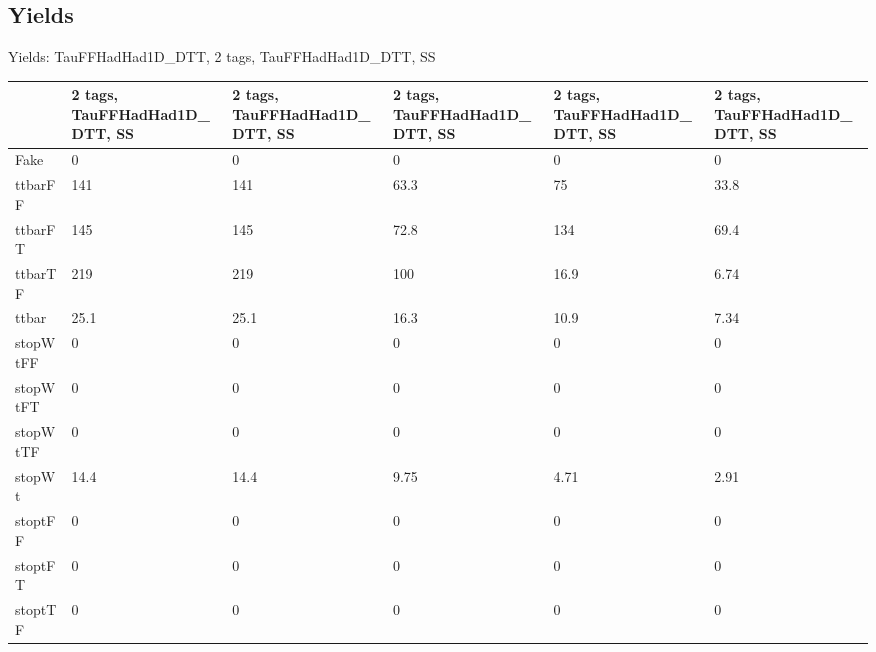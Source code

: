
\subsection{Yields}

\begin{frame}{Yields: TauFFHadHad1D\_DTT, 2 tags, TauFFHadHad1D\_DTT, SS}
\begin{center}
  \begin{tabular}{l| >{\centering\let\newline\\\arraybackslash\hspace{0pt}}m{1.4cm}| >{\centering\let\newline\\\arraybackslash\hspace{0pt}}m{1.4cm}| >{\centering\let\newline\\\arraybackslash\hspace{0pt}}m{1.4cm}| >{\centering\let\newline\\\arraybackslash\hspace{0pt}}m{1.4cm}| >{\centering\let\newline\\\arraybackslash\hspace{0pt}}m{1.4cm}}
    & 2 tags, TauFFHadHad1D\_DTT, SS & 2 tags, TauFFHadHad1D\_DTT, SS & 2 tags, TauFFHadHad1D\_DTT, SS & 2 tags, TauFFHadHad1D\_DTT, SS & 2 tags, TauFFHadHad1D\_DTT, SS \\
 \hline \hline
    Fake& 0 & 0 & 0 & 0 & 0 \\
 \hline
    ttbarFF& 141 & 141 & 63.3 & 75 & 33.8 \\
 \hline
    ttbarFT& 145 & 145 & 72.8 & 134 & 69.4 \\
 \hline
    ttbarTF& 219 & 219 & 100 & 16.9 & 6.74 \\
 \hline
    ttbar& 25.1 & 25.1 & 16.3 & 10.9 & 7.34 \\
 \hline
    stopWtFF& 0 & 0 & 0 & 0 & 0 \\
 \hline
    stopWtFT& 0 & 0 & 0 & 0 & 0 \\
 \hline
    stopWtTF& 0 & 0 & 0 & 0 & 0 \\
 \hline
    stopWt& 14.4 & 14.4 & 9.75 & 4.71 & 2.91 \\
 \hline
    stoptFF& 0 & 0 & 0 & 0 & 0 \\
 \hline
    stoptFT& 0 & 0 & 0 & 0 & 0 \\
 \hline
    stoptTF& 0 & 0 & 0 & 0 & 0 \\

\end{tabular}
\end{center}
\end{frame}
